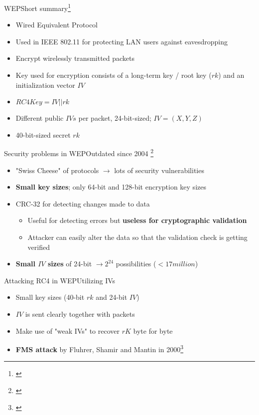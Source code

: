 \documentclass[
	aspectratio=169,	%
	onlytextwidth,		%
	t					%
	]{beamer}
\begin{document}
\begin{frame}[fragile]{WEP}{Short summary\footnote[frame]{\cite{wepproblems}}}
	\begin{itemize}[<+->]
		\item Wired Equivalent Protocol
		\item Used in IEEE 802.11 for protecting LAN users against eavesdropping
		\item Encrypt wirelessly transmitted packets
		\item Key used for encryption consists of a long-term key / root key ($rk$) and an initialization vector $IV$
		\item $RC4Key = IV||rk$
		\item Different public $IVs$ per packet, 24-bit-sized; $IV=(X,Y,Z)$
		\item 40-bit-sized secret $rk$
	\end{itemize}
\end{frame}

\begin{frame}[fragile]{Security problems in WEP}{Outdated since 2004 \footnote[frame]{\cite{wepcracking}}}
	\begin{itemize}[<+->]
		\item "Swiss Cheese" of protocols $\rightarrow$ lots of security vulnerabilities
		\item \textbf{Small key sizes}; only 64-bit and 128-bit encryption key sizes
		\item CRC-32 for detecting changes made to data
		\begin{itemize}
			\item Useful for detecting errors but \textbf{useless for cryptographic validation}
			\item Attacker can easily alter the data so that the validation check is getting verified
		\end{itemize}
		\item \textbf{Small $IV$ sizes} of 24-bit $\rightarrow 2^{24}$ possibilities ($<17 million$)
	\end{itemize}
\end{frame}

\begin{frame}[fragile]{Attacking RC4 in WEP}{Utilizing IVs}
	\begin{itemize}[<+->]
		\item Small key sizes (40-bit $rk$ and 24-bit $IV$)
		\item $IV$ is sent clearly together with packets
		\item Make use of "weak IVs" to recover $rK$ byte for byte
		\item \textbf{FMS attack} by Fluhrer, Shamir and Mantin in 2000\footnote[frame]{\cite{fluhrer2001weaknesses}}
	\end{itemize}
\end{frame}
\end{document}
